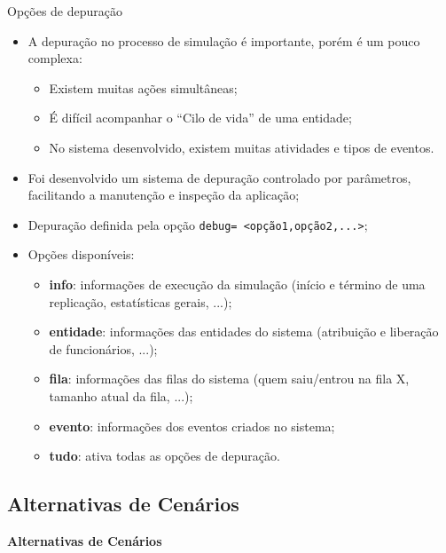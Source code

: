 \documentclass[xcolor=dvipsnames]{beamer}
\newcommand{\aspas}[1]{``#1''}
\let\olditem=\item%
\renewcommand{\item}{\olditem \justifying}%
\begin{document}
\begin{frame}[allowframebreaks]{Opções de depuração}
	\begin{itemize}
		\item A depuração no processo de simulação é importante, porém é um pouco complexa:
        \bigskip
		      \begin{itemize}
		      	\item Existem muitas ações simultâneas;
		      	      \bigskip
		      	\item É difícil acompanhar o \aspas{Cilo de vida} de uma entidade;
		      	      \bigskip
		      	\item No sistema desenvolvido, existem muitas atividades e tipos de eventos.
		      \end{itemize}
		      \bigskip
		      \framebreak
		\item Foi desenvolvido um sistema de depuração controlado por parâmetros, facilitando a manutenção e inspeção da aplicação;
		      \bigskip
		\item Depuração definida pela opção \texttt{debug= <opção1,opção2,...>};
		      \bigskip
		\item Opções disponíveis:
		      \begin{itemize}
		      	\item \textbf{info}: informações de execução da simulação (início e término de uma replicação, estatísticas gerais, ...);
		      	      \bigskip
		      	\item \textbf{entidade}: informações das entidades do sistema (atribuição e liberação de funcionários, ...);
		      	      \bigskip
		      	\item \textbf{fila}: informações das filas do sistema (quem saiu/entrou na fila X, tamanho atual da fila, ...);
		      	      \bigskip
		      	\item \textbf{evento}: informações dos eventos criados no sistema;
		      	      \bigskip
		      	\item \textbf{tudo}: ativa todas as opções de depuração.
		      \end{itemize}
	\end{itemize}
\end{frame}
	
	
\subsection{Alternativas de Cenários}
	
\begin{frame}{}
	\centering
	\Huge \color{blue} \textbf{Alternativas de Cenários}
\end{frame}
	
\end{document}
